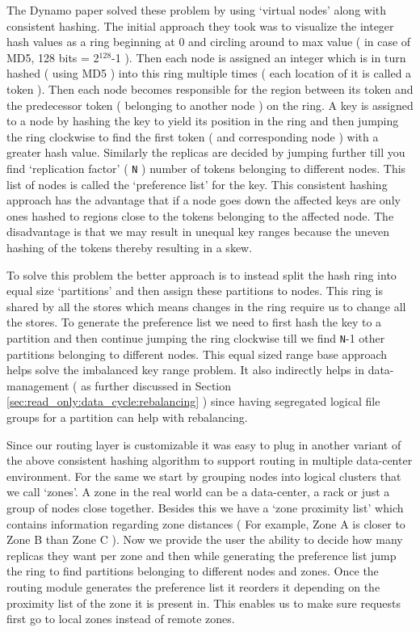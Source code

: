 \documentclass[10pt,twocolumn,preprint,natbib,authoryear]{sigplanconf}
\begin{document}
The Dynamo paper solved these problem by using `virtual nodes' along with consistent hashing. The initial approach they took was to visualize the integer hash values as a ring beginning at 0 and circling around to max value ( in case of MD5, 128 bits = 2$^{128}$-1 ). Then each node is assigned an integer which is in turn hashed ( using MD5 ) into this ring multiple times ( each location of it is called a token ). Then each node becomes responsible for the region between its token and the predecessor token ( belonging to another node ) on the ring. A key is assigned to a node by hashing the key to yield its position in the ring and then jumping the ring clockwise to find the first token ( and corresponding node ) with a greater hash value. Similarly the replicas are decided by jumping further till you find `replication factor' ( \verb=N= ) number of tokens belonging to different nodes. This list of nodes is called the `preference list' for the key. This consistent hashing approach has the advantage that if a node goes down the affected keys are only ones hashed to regions close to the tokens belonging to the affected node. The disadvantage is that we may result in unequal key ranges because the uneven hashing of the tokens thereby resulting in a skew. 

To solve this problem the better approach is to instead split the hash ring into equal size `partitions' and then assign these partitions to nodes. This ring is shared by all the stores which means changes in the ring require us to change all the stores. To generate the preference list we need to first hash the key to a partition and then continue jumping the ring clockwise till we find \verb=N=-1 other partitions belonging to different nodes. This equal sized range base approach helps solve the imbalanced key range problem. It also indirectly helps in data-management ( as further discussed in Section \ref{sec:read_only:data_cycle:rebalancing} ) since having segregated logical file groups for a partition can help with rebalancing. 

Since our routing layer is customizable it was easy to plug in another variant of the above consistent hashing algorithm to support routing in multiple data-center environment. For the same we start by grouping nodes into logical clusters that we call `zones'. A zone in the real world can be a data-center, a rack or just a group of nodes close together. Besides this we have a `zone proximity list' which contains information regarding zone distances ( For example, Zone A is closer to Zone B than Zone C ). Now we provide the user the ability to decide how many replicas they want per zone and then while generating the preference list jump the ring to find partitions belonging to different nodes and zones. Once the routing module generates the preference list it reorders it depending on the proximity list of the zone it is present in. This enables us to make sure requests first go to local zones instead of remote zones. 
\end{document}
